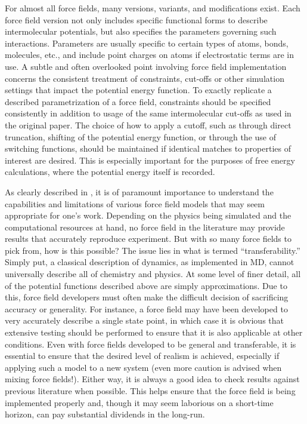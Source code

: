 \documentclass[9pt,bestpractices]{livecoms}
\begin{document}
For almost all force fields, many versions, variants, and modifications exist.
Each force field version not only includes specific functional forms to describe intermolecular potentials, but also specifies the parameters governing such interactions.
Parameters are usually specific to certain types of atoms, bonds, molecules, etc., and include point charges on atoms if electrostatic terms are in use. 
A subtle and often overlooked point involving force field implementation concerns the consistent treatment of constraints, cut-offs or other simulation settings that impact the potential energy function.
To exactly replicate a described parametrization of a force field, constraints should be specified consistently in addition to usage of the same intermolecular cut-offs as used in the original paper.
The choice of how to apply a cutoff, such as through direct truncation, shifting of the potential energy function, or through the use of switching functions, should be maintained if identical matches to properties of interest are desired.
This is especially important for the purposes of free energy calculations, where the potential energy itself is recorded.

As clearly described in \citet{Becker2013}, it is of paramount importance to understand the capabilities and limitations of various force field models that may seem appropriate for one's work. 
Depending on the physics being simulated and the computational resources at hand, no force field in the literature may provide results that accurately reproduce experiment.
But with so many force fields to pick from, how is this possible?
The issue lies in what is termed ``transferability.'' 
Simply put, a classical description of dynamics, as implemented in MD, cannot universally describe all of chemistry and physics. 
At some level of finer detail, all of the potential functions described above are simply approximations.
Due to this, force field developers must often make the difficult decision of sacrificing accuracy or generality. 
For instance, a force field may have been developed to very accurately describe a single state point, in which case it is obvious that extensive testing should be performed to ensure that it is also applicable at other conditions.
Even with force fields developed to be general and transferable, it is essential to ensure that the desired level of realism is achieved, especially if applying such a model to a new system (even more caution is advised when mixing force fields!).
Either way, it is always a good idea to check results against previous literature when possible.
This helps ensure that the force field is being implemented properly and, though it may seem laborious on a short-time horizon, can pay substantial dividends in the long-run.
\end{document}
